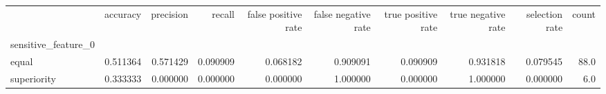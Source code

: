 \begin{tabular}{lrrrrrrrrr}
\toprule
{} &  accuracy &  precision &    recall &  false positive rate &  false negative rate &  true positive rate &  true negative rate &  selection rate &  count \\
sensitive\_feature\_0 &           &            &           &                      &                      &                     &                     &                 &        \\
\midrule
equal               &  0.511364 &   0.571429 &  0.090909 &             0.068182 &             0.909091 &            0.090909 &            0.931818 &        0.079545 &   88.0 \\
superiority         &  0.333333 &   0.000000 &  0.000000 &             0.000000 &             1.000000 &            0.000000 &            1.000000 &        0.000000 &    6.0 \\
\bottomrule
\end{tabular}
